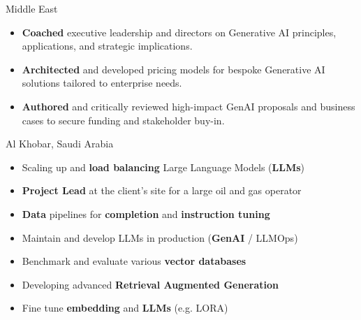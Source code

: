 \documentclass[10pt,a4paper,ragged2e]{altacv}
\begin{document}
\divider

     {Middle East}

\begin{itemize}
	\item \textbf{Coached} executive leadership and directors on Generative AI principles, applications, and strategic implications.
	\item \textbf{Architected} and developed pricing models for bespoke Generative AI solutions tailored to enterprise needs.
	\item \textbf{Authored} and critically reviewed high-impact GenAI proposals and business cases to secure funding and stakeholder buy-in.
	
\end{itemize}

\divider 

     {Al Khobar, Saudi Arabia}

\begin{itemize}
	\item Scaling up and \textbf{load balancing} Large Language Models (\textbf{LLMs})
	\item \textbf{Project Lead} at the client's site for a large oil and gas operator
	\item \textbf{Data} pipelines for \textbf{completion} and \textbf{instruction tuning} 
	\item Maintain and develop LLMs in production (\textbf{GenAI} / LLMOps)
	\item Benchmark and evaluate various \textbf{vector databases}
	\item Developing advanced \textbf{Retrieval Augmented Generation}
	\item Fine tune \textbf{embedding} and \textbf{LLMs} (e.g. LORA)

\end{itemize}

\divider 
\end{document}
